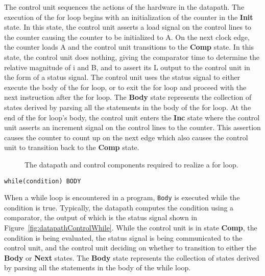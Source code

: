 \begin{description}
        The control unit sequences the actions of the hardware in the
        datapath.  The execution of the for loop begins with an
        initialization of the counter in the \textbf{ Init} state.  In this state,
        the control unit asserts a load signal on the control lines to
        the counter causing the counter to be initialized to A.  On the
        next clock edge, the counter loads A and the control unit
        transitions to the \textbf{ Comp} state.  In this state, the control unit
        does nothing, giving the comparator time to determine the
        relative magnitude of i and B, and to assert its L output
        to the control unit in the form of a status signal. The control
        unit uses the status signal to either execute the body of
        the for loop, or to exit the for loop and proceed with
        the next instruction after the for loop.  The \textbf{ Body} state
        represents the collection of states derived by parsing all
        the statements in the body of the for loop.  At the end of the
        for loop's body, the control unit enters the \textbf{ Inc} state where the
        control unit asserts an increment signal on the control lines
        to the counter.  This assertion causes the counter to count up on the
        next edge which also causes the control unit to transition
        back to the \textbf{ Comp} state.

        \begin{figure}[ht]
            \caption{The datapath and control components required to realize
            a for loop.}
            \label{fig:datapathControlFor}
        \end{figure}

    \item[]\verb+while(condition) BODY+

        When a while loop is encountered in a program, \verb^Body^ is executed
        while the condition is true.  Typically,
        the datapath computes the condition using a comparator, the
        output of which is the status signal shown in
        Figure~\ref{fig:datapathControlWhile}.  While the control unit is in state
        \textbf{ Comp}, the condition is being evaluated, the status signal is
        being communicated to the control unit, and the control unit
        deciding on whether to transition to either the \textbf{ Body} or
        \textbf{ Next} states.  The \textbf{ Body} state represents the
        collection of states derived by parsing all the statements
        in the body of the while loop.


\end{description}
